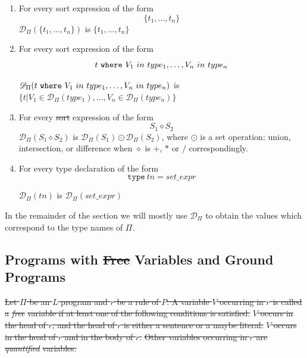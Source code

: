 \documentclass[a4paper,10pt]{article}
\providecommand{\DIFaddtex}[1]{{\protect\color{blue}\uwave{#1}}} %
\providecommand{\DIFdeltex}[1]{{\protect\color{red}\sout{#1}}}                      %
\providecommand{\DIFaddbegin}{} %
\providecommand{\DIFaddend}{} %
\providecommand{\DIFdelbegin}{} %
\providecommand{\DIFdelend}{} %
\providecommand{\DIFadd}[1]{\texorpdfstring{\DIFaddtex{#1}}{#1}} %
\providecommand{\DIFdel}[1]{\texorpdfstring{\DIFdeltex{#1}}{}} %
\begin{document}
\begin{enumerate}
\item For every sort expression of the form $$\{t_1,\ldots,t_n\}$$   $\mathcal{D}_\Pi(\{t_1,\ldots,t_n\})$ is $ \{t_1,\ldots,t_n\}$
\item For every sort expression of the form   $$t~\mbox{\texttt{where}} ~V_1~in~type_1,\ldots, V_n~in~type_n$$

\noindent
$\mathcal{D}_\Pi(t~\mbox{\texttt{where}} ~V_1~in~type_1,\ldots, V_n~in~type_n)$ is $\{t| V_1 \in \mathcal{D}_\Pi(type_1),\ldots, V_n \in \mathcal{D}_\Pi(type_n)\}$ 
\item For every \DIFdelbegin \DIFdel{sort }\DIFdelend \DIFaddbegin \DIFadd{set }\DIFaddend expression of the form $$S_1 \diamond S_2$$ 
$\mathcal{D}_\Pi(S_1 \diamond S_2)$ is $ \mathcal{D}_\Pi(S_1) \odot  \mathcal{D}_\Pi(S_2)$, where $\odot$ is a set operation: union, intersection, or difference when $\diamond$ is $+$, $*$ or \DIFdelbegin \DIFdel{$/$ }\DIFdelend \DIFaddbegin \DIFadd{$\backslash$ }\DIFaddend correspondingly.

\item For every type declaration of the form $$\texttt{type}~tn = set\_expr$$

$\mathcal{D}_\Pi(tn)$ is $\mathcal{D}_\Pi(set\_expr)$  


\end{enumerate}

\medskip\noindent
In the remainder of the section  we will mostly  use   $\mathcal{D}_\Pi$ to obtain the values  which correspond to the type names of $\Pi$.


\subsection{Programs with \DIFdelbegin \DIFdel{Free }\DIFdelend Variables and Ground Programs}\label{grp}

\DIFdelbegin \DIFdel{Let $\Pi$ be an $L$ program and $r$ be a rule of $P$. 
A variable $V$ occurring in  $r$  is called a }\textit{\DIFdel{free}} %
\DIFdel{variable if at least one of the following conditions is satisfied:
}%
\DIFdel{$V$ occurs in the  head of $r$, and the head of $r$ is either a sentence or a maybe literal.
}%
\DIFdel{$V$ occurs in the head of $r$ and in the body of $r$.
}%
\DIFdel{Other variables occurring in $r$ are }\textit{\DIFdel{quantified}} %
\DIFdel{variables.
}%
\end{document}
